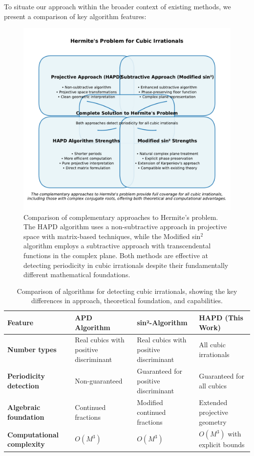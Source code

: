To situate our approach within the broader context of existing methods, we present a comparison of key algorithm features:

\begin{figure}[htbp]
\begin{minipage}{\textwidth}
\centering
\includegraphics[width=\textwidth]{figures/complementary_solutions_diagram.pdf}
\caption{Comparison of complementary approaches to Hermite's problem. The HAPD algorithm uses a non-subtractive approach in projective space with matrix-based techniques, while the Modified sin$^2$ algorithm employs a subtractive approach with transcendental functions in the complex plane. Both methods are effective at detecting periodicity in cubic irrationals despite their fundamentally different mathematical foundations.}
\label{fig:complementary_approaches}
\end{minipage}
\end{figure}

\begin{table}[ht]
\centering
\begin{tabular}{|p{2.8cm}|p{2.8cm}|p{2.5cm}|p{2.5cm}|}
\hline
\textbf{Feature} & \textbf{APD Algorithm} & \textbf{sin²-Algorithm} & \textbf{HAPD (This Work)} \\
\hline
\textbf{Number types} & Real cubics with positive discriminant & Real cubics with positive discriminant & All cubic irrationals \\
\hline
\textbf{Periodicity detection} & Non-guaranteed & Guaranteed for positive discriminant & Guaranteed for all cubics \\
\hline
\textbf{Algebraic foundation} & Continued fractions & Modified continued fractions & Extended projective geometry \\
\hline
\textbf{Computational complexity} & $O(M^3)$ & $O(M^3)$ & $O(M^3)$ with explicit bounds \\
\hline
\end{tabular}
\caption{Comparison of algorithms for detecting cubic irrationals, showing the key differences in approach, theoretical foundation, and capabilities.}
\label{tab:algorithm_comparison}
\end{table}
